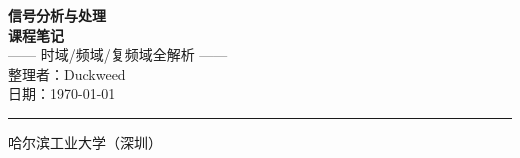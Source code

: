 \thispagestyle{empty}
\restoregeometry
{}

\begin{center}
    \vspace*{1cm}
    
    {\Huge\bfseries 信号分析与处理}\\[1cm]
    {\Large\bfseries 课程笔记}\\[0.5cm]
    {\Large —— 时域/频域/复频域全解析 ——}\\[2cm]
    
    {\Large 整理者：Duckweed}\\[0.5cm]
    {\Large 日期：\today}\\[1cm]
    
    \vfill
    \rule{\linewidth}{0.5mm}
    \vspace{0.5cm}
    {\small 哈尔滨工业大学（深圳）}
\end{center}

\clearpage
\restoregeometry
